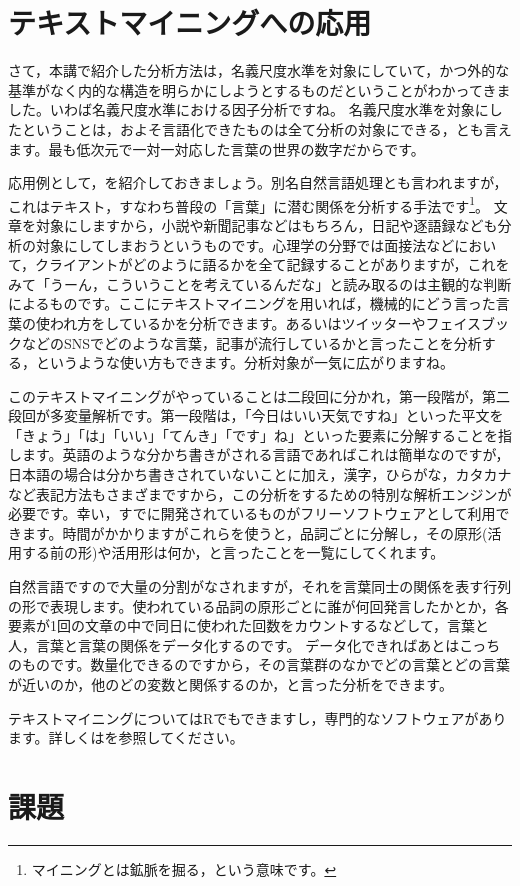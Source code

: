 \documentclass{ltjsbook}
\begin{document}
\section{テキストマイニングへの応用}
さて，本講で紹介した分析方法は，名義尺度水準を対象にしていて，かつ外的な基準がなく内的な構造を明らかにしようとするものだということがわかってきました。いわば名義尺度水準における因子分析ですね。
名義尺度水準を対象にしたということは，およそ言語化できたものは全て分析の対象にできる，とも言えます。最も低次元で一対一対応した言葉の世界の数字だからです。

応用例として，を紹介しておきましょう。別名自然言語処理とも言われますが，これはテキスト，すなわち普段の「言葉」に潜む関係を分析する手法です\footnote{マイニングとは鉱脈を掘る，という意味です。}。
文章を対象にしますから，小説や新聞記事などはもちろん，日記や逐語録なども分析の対象にしてしまおうというものです。心理学の分野では面接法などにおいて，クライアントがどのように語るかを全て記録することがありますが，これをみて「うーん，こういうことを考えているんだな」と読み取るのは主観的な判断によるものです。ここにテキストマイニングを用いれば，機械的にどう言った言葉の使われ方をしているかを分析できます。あるいはツイッターやフェイスブックなどのSNSでどのような言葉，記事が流行しているかと言ったことを分析する，というような使い方もできます。分析対象が一気に広がりますね。

このテキストマイニングがやっていることは二段回に分かれ，第一段階が，第二段回が多変量解析です。第一段階は，「今日はいい天気ですね」といった平文を「きょう」「は」「いい」「てんき」「です」ね」といった要素に分解することを指します。英語のような分かち書きがされる言語であればこれは簡単なのですが，日本語の場合は分かち書きされていないことに加え，漢字，ひらがな，カタカナなど表記方法もさまざまですから，この分析をするための特別な解析エンジンが必要です。幸い，すでに開発されているものがフリーソフトウェアとして利用できます。時間がかかりますがこれらを使うと，品詞ごとに分解し，その原形(活用する前の形)や活用形は何か，と言ったことを一覧にしてくれます。

自然言語ですので大量の分割がなされますが，それを言葉同士の関係を表す行列の形で表現します。使われている品詞の原形ごとに誰が何回発言したかとか，各要素が1回の文章の中で同日に使われた回数をカウントするなどして，言葉と人，言葉と言葉の関係をデータ化するのです。
データ化できればあとはこっちのものです。数量化できるのですから，その言葉群のなかでどの言葉とどの言葉が近いのか，他のどの変数と関係するのか，と言った分析をできます。

テキストマイニングについてはRでもできますし，専門的なソフトウェアがあります。詳しくは\citet{樋口耕一2020-04-06}を参照してください。

\section{課題}
\end{document}
